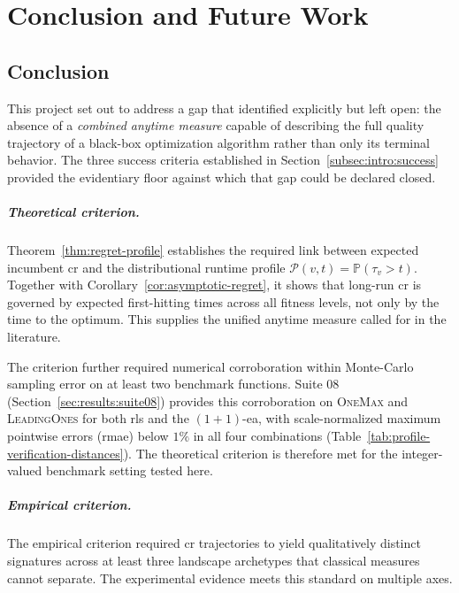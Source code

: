\chapter{Conclusion and Future Work}
\label{cha:conc}

\section{Conclusion}

This project set out to address a gap that \citet{pinto2018practice}
identified explicitly but left open: the absence of a \textit{combined
anytime measure} capable of describing the full quality trajectory of a
black-box optimization algorithm rather than only its terminal behavior.
The three success criteria established in
Section~\ref{subsec:intro:success} provided the evidentiary floor
against which that gap could be declared closed.

\paragraph{Theoretical criterion.}
Theorem~\ref{thm:regret-profile} establishes the required link between
expected incumbent \acrfull{cr} and the distributional runtime profile
$\mathcal{P}(v,t) = \mathbb{P}(\tau_v > t)$. Together with
Corollary~\ref{cor:asymptotic-regret}, it shows that long-run
\acrshort{cr} is governed by expected first-hitting times across
all fitness levels, not only by the time to the optimum. This supplies
the unified anytime measure called for in the literature.

The criterion further required numerical corroboration within
Monte-Carlo sampling error on at least two benchmark functions. Suite
08 (Section~\ref{sec:results:suite08}) provides this corroboration on
\textsc{OneMax} and \textsc{LeadingOnes} for both \acrshort{rls} and
the $(1+1)$-\acrshort{ea}, with scale-normalized maximum pointwise
errors (\acrshort{rmae}) below $1\%$ in all four combinations
(Table~\ref{tab:profile-verification-distances}).
The theoretical criterion is therefore met for the integer-valued benchmark
setting tested here.

\paragraph{Empirical criterion.}
The empirical criterion required \acrshort{cr} trajectories to
yield qualitatively distinct signatures across at least three landscape
archetypes that classical measures cannot separate. The experimental
evidence meets this standard on multiple axes.

